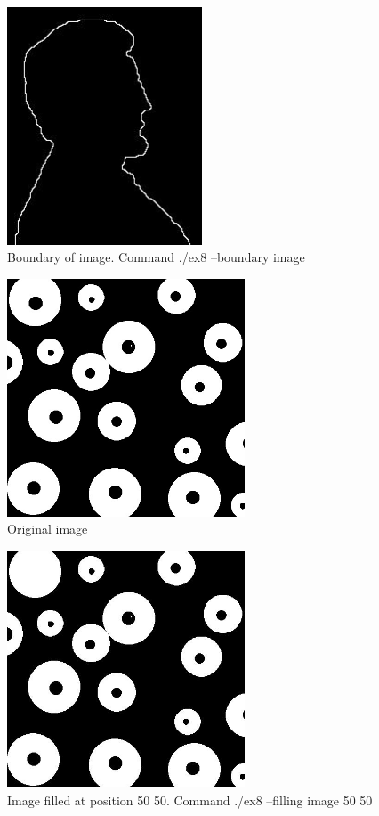 \documentclass[10pt]{article}
\begin{document}
\begin{figure}[!ht]
	\centering
	\includegraphics[height=200pt]{./ex8/lincoln_boundary.jpg}
	\caption{Boundary of image. Command ./ex8 --boundary image}
\end{figure}
\begin{figure}[!ht]
	\centering
	\includegraphics[height=200pt]{./ex8/region.jpg}
	\caption{Original image}
\end{figure}
\begin{figure}[!ht]
	\centering
	\includegraphics[height=200pt]{./ex8/region_filled.jpg}
	\caption{Image filled at position 50 50. Command ./ex8 --filling image 50 50}
\end{figure}
\end{document}
